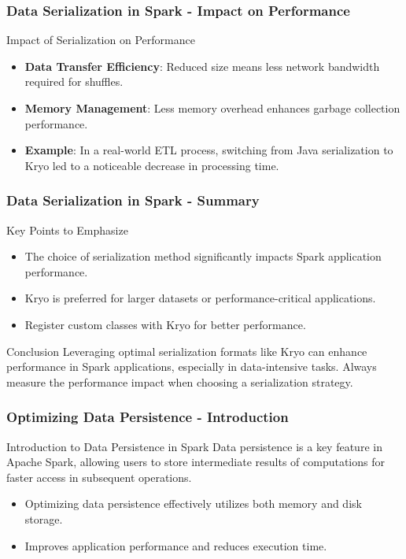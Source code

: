 \documentclass[aspectratio=169]{beamer}
\begin{document}
\begin{frame}[fragile]
    \frametitle{Data Serialization in Spark - Impact on Performance}
    \begin{block}{Impact of Serialization on Performance}
        \begin{itemize}
            \item \textbf{Data Transfer Efficiency}: Reduced size means less network bandwidth required for shuffles.
            \item \textbf{Memory Management}: Less memory overhead enhances garbage collection performance.
            \item \textbf{Example}: In a real-world ETL process, switching from Java serialization to Kryo led to a noticeable decrease in processing time.
        \end{itemize}
    \end{block}
\end{frame}

\begin{frame}[fragile]
    \frametitle{Data Serialization in Spark - Summary}
    \begin{block}{Key Points to Emphasize}
        \begin{itemize}
            \item The choice of serialization method significantly impacts Spark application performance.
            \item Kryo is preferred for larger datasets or performance-critical applications.
            \item Register custom classes with Kryo for better performance.
        \end{itemize}
    \end{block}
    
    \begin{block}{Conclusion}
        Leveraging optimal serialization formats like Kryo can enhance performance in Spark applications, especially in data-intensive tasks. Always measure the performance impact when choosing a serialization strategy.
    \end{block}
\end{frame}

\begin{frame}[fragile]
    \frametitle{Optimizing Data Persistence - Introduction}
    \begin{block}{Introduction to Data Persistence in Spark}
        Data persistence is a key feature in Apache Spark, allowing users to store intermediate results of computations for faster access in subsequent operations. 
        \begin{itemize}
            \item Optimizing data persistence effectively utilizes both memory and disk storage.
            \item Improves application performance and reduces execution time.
        \end{itemize}
    \end{block}
\end{frame}
\end{document}
